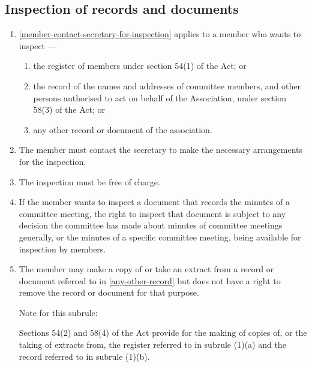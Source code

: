 \documentclass[../constitution.tex]{subfiles}
\begin{document}
\hypertarget{inspection-of-records-and-documents}{%
\subsection{Inspection of records and documents}\label{inspection-of-records-and-documents}}

\begin{enumerate}

\item {} \ref{member-contact-secretary-for-inspection} applies to a member who wants to inspect ---

  \begin{enumerate}
  
  \item the register of members under section 54(1) of the Act; or
  \item the record of the names and addresses of committee members, and other persons authorised to act on behalf of the Association, under section 58(3) of the Act; or
  \item any other record or document of the association. \label{any-other-record}
  \end{enumerate}
\item The member must contact the secretary to make the necessary arrangements for the inspection. \label{member-contact-secretary-for-inspection}
\item The inspection must be free of charge.
\item If the member wants to inspect a document that records the minutes of a committee meeting, the right to inspect that document is subject to any decision the committee has made about minutes of committee meetings generally, or the minutes of a specific committee meeting, being available for inspection by members.
\item The member may make a copy of or take an extract from a record or document referred to in  \ref{any-other-record} but does not have a right to remove the record or document for that purpose.


Note for this subrule: 

Sections 54(2) and 58(4) of the Act provide for the making of copies of, or the taking of extracts from, the register referred to in subrule (1)(a) and the record referred to in subrule (1)(b). 


\end{enumerate}
\end{document}
